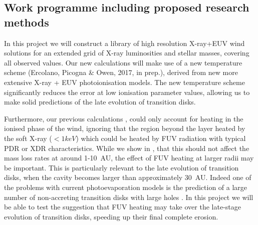 \documentclass[10pt,fleqn,twoside]{article}
\begin{document}




\subsection{Work programme including proposed research methods}
In this project we will construct a
library of high resolution X-ray+EUV wind solutions for an extended grid of
X-ray luminosities and stellar masses, covering all observed
values. Our new calculations will make use of a new temperature
scheme (Ercolano, Picogna \& Owen, 2017, in prep.), derived from
new more extensive X-ray + EUV photoionisation models.  The new
temperature scheme
significantly reduces the error at low ionisation parameter values,
allowing us to make solid predictions of the late evolution of
transition disks. 

Furthermore, our previous calculations 
\citep{2010MNRAS.401.1415O, 2011MNRAS.412...13O, 2012MNRAS.422.1880O},
could only account for heating 
in the ionised phase of the wind, ignoring that the region beyond the
layer heated by the soft X-ray ($<1keV$) which could be heated by FUV
radiation with typical PDR or XDR characteristics. While we show in
\citet{2012MNRAS.422.1880O},
that this should not affect the mass loss rates at
around 1-10~AU, the effect of FUV heating at larger radii may be
important. This is particularly relevant to the late evolution of
transition disks, when the cavity becomes larger than approximately
30~AU. Indeed one of the
problems with current photoevaporation models is the prediction of a
large number of non-accreting transition disks with large holes
\citep[e.g.,][]{2016PASA...33....5O}.
In this project we will be able to test the
suggestion that FUV heating may take over the late-stage evolution of
transition disks, speeding up their final complete erosion. 

\end{document}
